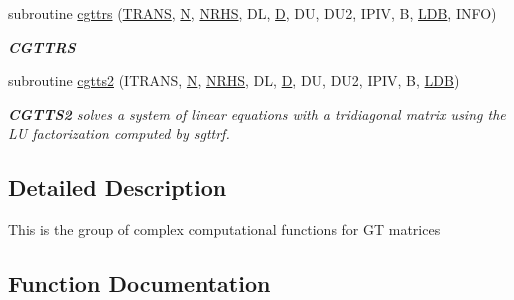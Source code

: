 \begin{DoxyCompactItemize}
subroutine \hyperlink{group__complexGTcomputational_gafe8bdadc6f4da5aa5df3fe22dbe6b05b}{cgttrs} (\hyperlink{superlu__enum__consts_8h_a0c4e17b2d5cea33f9991ccc6a6678d62a1f61e3015bfe0f0c2c3fda4c5a0cdf58}{T\+R\+A\+N\+S}, \hyperlink{polmisc_8c_a0240ac851181b84ac374872dc5434ee4}{N}, \hyperlink{example__user_8c_aa0138da002ce2a90360df2f521eb3198}{N\+R\+H\+S}, D\+L, \hyperlink{odrpack_8h_a7dae6ea403d00f3687f24a874e67d139}{D}, D\+U, D\+U2, I\+P\+I\+V, B, \hyperlink{example__user_8c_a50e90a7104df172b5a89a06c47fcca04}{L\+D\+B}, I\+N\+F\+O)
\begin{DoxyCompactList}\small\item\em {\bfseries C\+G\+T\+T\+R\+S} \end{DoxyCompactList}\item 
subroutine \hyperlink{group__complexGTcomputational_gab3cb48a1dae8355cc937e9c97ac5ded0}{cgtts2} (I\+T\+R\+A\+N\+S, \hyperlink{polmisc_8c_a0240ac851181b84ac374872dc5434ee4}{N}, \hyperlink{example__user_8c_aa0138da002ce2a90360df2f521eb3198}{N\+R\+H\+S}, D\+L, \hyperlink{odrpack_8h_a7dae6ea403d00f3687f24a874e67d139}{D}, D\+U, D\+U2, I\+P\+I\+V, B, \hyperlink{example__user_8c_a50e90a7104df172b5a89a06c47fcca04}{L\+D\+B})
\begin{DoxyCompactList}\small\item\em {\bfseries C\+G\+T\+T\+S2} solves a system of linear equations with a tridiagonal matrix using the L\+U factorization computed by sgttrf. \end{DoxyCompactList}\end{DoxyCompactItemize}


\subsection{Detailed Description}
This is the group of complex computational functions for G\+T matrices 

\subsection{Function Documentation}
\hypertarget{group__complexGTcomputational_ga8f80227b32b600dc75a5e982005ec1c2}{}
